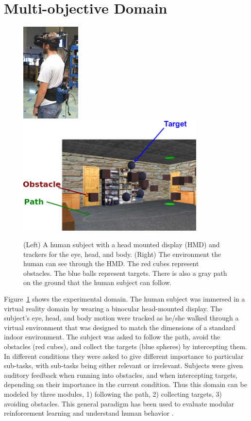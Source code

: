 \section{Multi-objective Domain}
\label{sec:domain}

\begin{figure}[h]
\centering
\includegraphics[height=5cm]{human.jpg}
\includegraphics[height=6cm]{env.png}
\caption{(Left) A human subject with a head mounted display (HMD) and trackers
for the eye, head, and body.  (Right) The environment the human can see through
the HMD.  The red cubes represent obstacles. The blue balls represent targets.
There is also a gray path on the ground that the human subject can follow.}
\label{fig:avatar}
\end{figure}

Figure~\ref{fig:avatar} shows the experimental domain. The
human subject was immersed in a virtual reality domain by wearing a binocular head-mounted display.
The subject's eye, head, and body motion were tracked as he/she walked through a
virtual environment that was designed to match the dimensions of a standard indoor
environment. The subject was asked to follow the path, avoid the obstacles (red
cubes), and collect the targets (blue spheres) by intercepting them. In
different conditions they were asked to give different importance to particular
sub-tasks, with sub-tasks being either relevant or irrelevant. Subjects were
given auditory feedback when running into obstacles, and when intercepting
targets, depending on their importance in the current condition. Thus this
domain can be modeled by three modules, 1) following the path, 2) collecting targets, 3)
avoiding obstacles.  This general paradigm has been used to evaluate modular
reinforcement learning \cite{Rothkopf12Infer, rothkopf2013modular} and understand human behavior
\cite{Tong2014}.

